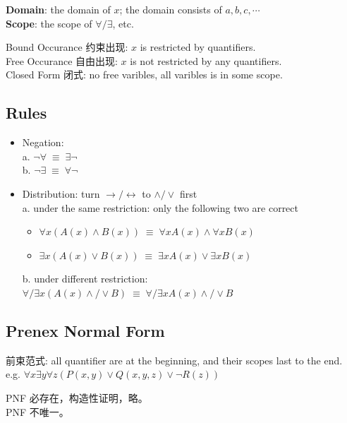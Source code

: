 \documentclass[12pt, a4paper, UTF8, openany]{ctexbook}
\newcommand{\bi}{\leftrightarrow} %
\begin{document}
        \textbf{Domain}: the domain of $x$; the domain consists of $a, b, c, \cdots$ \\
        \textbf{Scope}: the scope of $\forall/\exists$, etc.

        Bound Occurance 约束出现: $x$ is restricted by quantifiers. \\
        Free Occurance 自由出现: $x$ is not restricted by any quantifiers. \\
        Closed Form 闭式: no free varibles, all varibles is in some scope. 

        \subsection{Rules}
        \begin{itemize}
            \item Negation: \\
                a. $\lnot \forall \; \equiv \; \exists \lnot$ \\
                b. $\lnot \exists \; \equiv \; \forall \lnot$
            \item Distribution: turn $\to/\bi$ to $\land/\lor$ first \\
                a. under the same restriction: only the following two are correct
                \begin{itemize}
                    \item $\forall x(A(x) \land B(x)) \; \equiv \; \forall x A(x) \land \forall x B(x)$
                    \item $\exists x(A(x) \lor B(x)) \; \equiv \; \exists x A(x) \lor \exists x B(x)$
                \end{itemize}
                b. under different restriction: 
                    $\forall/\exists x(A(x) \land/\lor B) \; \equiv \; \forall/\exists x A(x) \land/\lor B$
        \end{itemize}

        \subsection{Prenex Normal Form}
        前束范式: all quantifier are at the beginning, and their scopes last to the end. \\
        e.g. $\forall x \exists y \forall z (P(x, y) \lor Q(x, y, z) \lor \lnot R(z))$

        PNF 必存在，构造性证明，略。\\
        PNF 不唯一。
\end{document}
